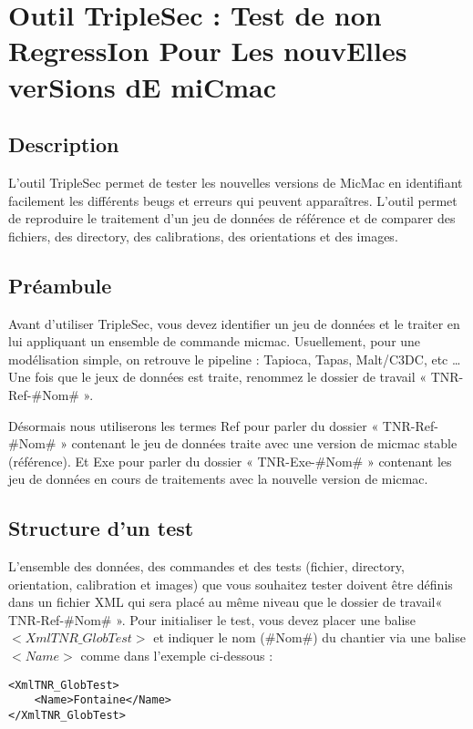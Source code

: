 \documentclass[a4paper]{book}
\begin{document}
\chapter{Outil TripleSec : Test de non RegressIon Pour Les nouvElles verSions dE miCmac}

\section{Description}
L'outil TripleSec permet de tester les nouvelles versions de MicMac en identifiant facilement les diff\'erents beugs et erreurs qui peuvent appara\^itres. L'outil permet de reproduire le traitement d'un jeu de donn\'ees de r\'ef\'erence et de comparer des fichiers, des directory, des calibrations, des orientations et des images.

\section{Pr\'eambule}
Avant d'utiliser TripleSec, vous devez identifier un jeu de donn\'ees et le traiter en lui appliquant un ensemble de commande micmac. Usuellement, pour une mod\'elisation simple, on retrouve le pipeline : Tapioca, Tapas, Malt/C3DC, etc …
Une fois que le jeux de donn\'ees est traite, renommez le dossier de travail « TNR-Ref-\#Nom\# ».

D\'esormais nous utiliserons les termes Ref pour parler du dossier « TNR-Ref-\#Nom\# » contenant le jeu de donn\'ees traite avec une version de micmac stable (r\'ef\'erence). Et Exe pour parler du dossier « TNR-Exe-\#Nom\# » contenant les jeu de donn\'ees en cours de traitements avec la nouvelle version de micmac.

\section{Structure d'un test}
L'ensemble des donn\'ees, des commandes et des tests (fichier, directory, orientation, calibration et images) que vous souhaitez tester doivent \^etre d\'efinis dans un fichier XML qui sera plac\'e au m\^eme niveau que le dossier de travail« TNR-Ref-\#Nom\# ».
Pour initialiser le test, vous devez placer une balise $<XmlTNR\_GlobTest>$ et indiquer le nom (\#Nom\#) du chantier via une balise $<Name>$ comme dans l'exemple ci-dessous :

\begin{verbatim}
<XmlTNR_GlobTest>
	<Name>Fontaine</Name>
</XmlTNR_GlobTest>
\end{verbatim}
\end{document}
